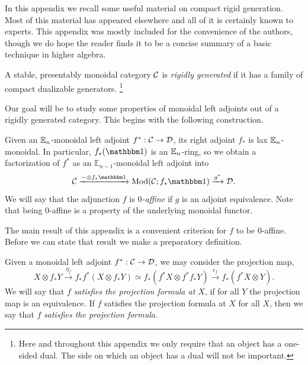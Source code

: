 In this appendix we recall some useful material on compact rigid generation.
Most of this material has appeared elsewhere and all of it is certainly known to experts.
This appendix was mostly included for the convenience of the authors,
though we do hope the reader finds it to be a concise summary of a basic technique in higher algebra.

\begin{dfn}
  A stable, presentably monoidal category $\mathcal{C}$ is \emph{rigidly generated} if
  it has a family of compact dualizable generators. \footnote{Here and throughout this appendix we only require that an object has a one-sided dual. The side on which an object has a dual will not be important.}
\end{dfn}

Our goal will be to study some properties of monoidal left adjoints out of a rigidly generated category.
This begins with the following construction.

\begin{cnstr}
  Given an $\mathbb{E}_n$-monoidal left adjoint
  $ f^* : \mathcal{C} \to \mathcal{D} $,
  its right adjoint $f_*$ is lax $\mathbb{E}_n$-monoidal.
  In particular, $f_* (\o)$ is an $\mathbb{E}_n$-ring,
  so we obtain a factorization of $f^*$ as an $\mathbb{E}_{n-1}$-monoidal left adjoint into
  \[ \CC \xrightarrow{ - \otimes f_*\o} \Mod ( \CC ; f_*\o ) \xrightarrow{g^*} \mathcal{D}. \]
  We will say that the adjunction $f$ is \emph{$0$-affine} if $g$ is an adjoint equivalence.
  Note that being $0$-affine is a property of the underlying monoidal functor. 
\end{cnstr}

The main result of this appendix is a convenient criterion for $f$ to be $0$-affine.
Before we can state that result we make a preparatory definition.

\begin{dfn}
  Given a monoidal left adjoint $f^* : \mathcal{C} \to \mathcal{D}$,
  we may consider the projection map,
  \[ X \otimes f_*Y \xrightarrow{\eta_f} f_*f^*(X \otimes f_*Y) \simeq f_*(f^*X \otimes f^*f_*Y) \xrightarrow{\epsilon_f} f_*(f^*X \otimes Y). \]
  We will say that $f$ \emph{satisfies the projection formula at $X$},
  if for all $Y$ the projection map is an equivalence.
  If $f$ satisfies the projection formula at $X$ for all $X$, then we say that $f$ \emph{satisfies the projection formula}.
\end{dfn}

